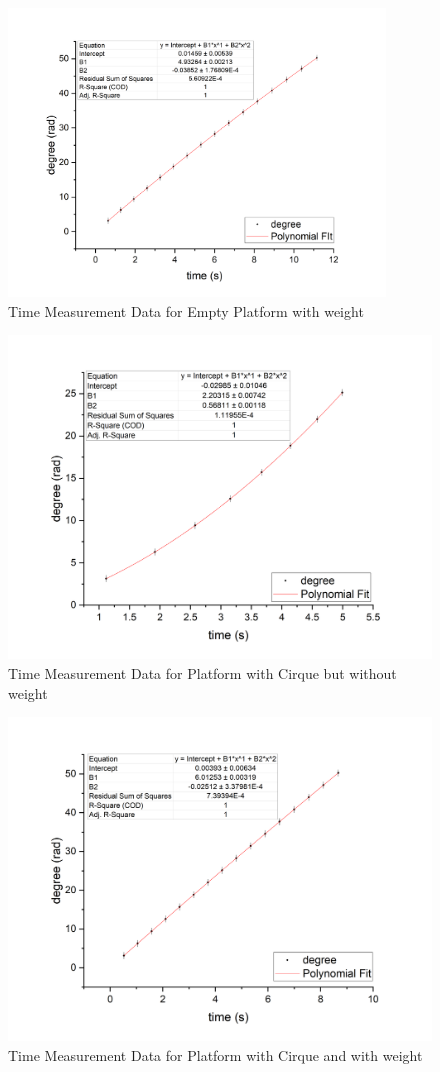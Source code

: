 \documentclass[12pt,a4paper]{article}
\begin{document}
\begin{figure}[h]
    \centering
    \includegraphics[width=10cm]{emptywo.png}
    \caption{Time Measurement Data for Empty Platform with weight}
\end{figure}

\begin{figure}[h]
    \centering
    \includegraphics[width=12cm]{cirquew.png}
    \caption{Time Measurement Data for Platform with Cirque but without weight}
\end{figure}

\begin{figure}[h]
    \centering
    \includegraphics[width=12cm]{cirquewo.png}
    \caption{Time Measurement Data for Platform with Cirque and with weight}
\end{figure}
\end{document}
